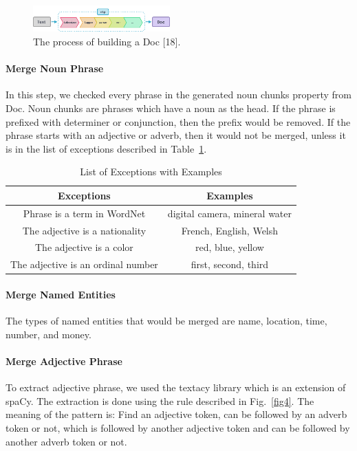 \documentclass[a4paper,conference]{IEEEtran}
\begin{document}
\begin{figure}[htbp]
\centerline{\includegraphics[width=0.47\textwidth]{fig3.png}}
\caption{The process of building a Doc [18].}
\label{fig3}
\end{figure}

\paragraph{Merge Noun Phrase}
In this step, we checked every phrase in the generated noun chunks property from Doc. Noun chunks are phrases which have a noun as the head. If the phrase is prefixed with determiner or conjunction, then the prefix would be removed. If the phrase starts with an adjective or adverb, then it would not be merged, unless it is in the list of exceptions described in Table~\ref{tab1}. 

\begin{table}[htbp]
\caption{List of Exceptions with Examples}
\begin{center}
\begin{tabular}{|c|c|}
\hline
\textbf{Exceptions} & \textbf{Examples}\\
\hline
Phrase is a term in WordNet&digital camera, mineral water\\
\hline
The adjective is a nationality&French, English, Welsh\\
\hline
The adjective is a color&red, blue, yellow\\
\hline
The adjective is an ordinal number&first, second, third\\
\hline
\end{tabular}
\label{tab1}
\end{center}
\end{table}

\paragraph{Merge Named Entities}
The types of named entities that would be merged are name, location, time, number, and money.

\paragraph{Merge Adjective Phrase}
To extract adjective phrase, we used the textacy library which is an extension of spaCy. The extraction is done using the rule described in Fig.~\ref{fig4}. The meaning of the pattern is: Find an adjective token, can be followed by an adverb token or not, which is followed by another adjective token and can be followed by another adverb token or not.
\end{document}
